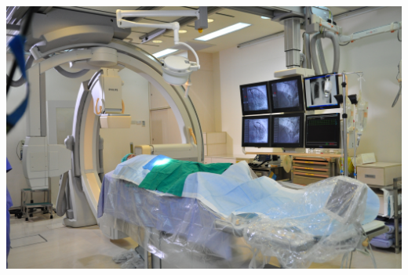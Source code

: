 \documentclass[25pt,a1paper]{tikzposter}
\begin{document}
{\begin{minipage}{0.45\linewidth}
\begin{tikzfigure}
\end{tikzfigure}

\end{minipage}\hfill
\begin{minipage}{0.45\linewidth}
  \centering
\begin{tikzfigure}
\includegraphics[width=0.8\linewidth]{DSC_0385.jpeg}
\end{tikzfigure}
\end{minipage} %



} %
\end{document}
